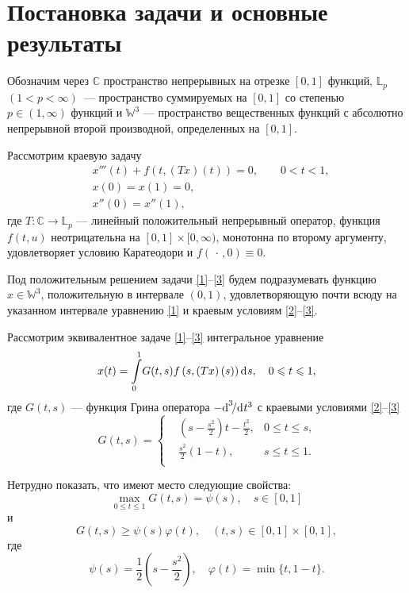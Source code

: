 \documentclass[press]{vestnik}
\begin{document}
\section{Постановка задачи и основные результаты}

Обозначим через $\mathbb{C}$ пространство непрерывных на отрезке $[0, 1]$ функций,  $\mathbb{L}_p$  $(1<p<\infty)$~--- пространство суммируемых на $[0, 1]$ со степенью $p\in (1,\infty)$ функций и  $\mathbb{W}^3$ --- пространство вещественных функций с абсолютно непрерывной второй производной, определенных на $[0, 1]$.

Рассмотрим краевую задачу
\begin{align}
&x'''(t)+f \left (t,\left(Tx \right)(t) \right)=0,\qquad 0<t<1,\label{1}\\
&x(0)=x(1)=0, \label{2} \\
&x''(0)=x''(1), \label{3}
\end{align}
где $T\colon \mathbb{C} \to \mathbb{L}_p$ --- линейный положительный непрерывный оператор, функция $f(t,u)$ неотрицательна на $[0, 1]\times[0, \infty)$, монотонна по второму аргументу, удовлетворяет условию Каратеодори и $f(\,\cdot\,, 0)\equiv0$.

Под положительным решением задачи \eqref{1}--\eqref{3} будем подразумевать  функцию $x\in \mathbb{W}^3$, положительную в интервале $(0, 1)$, удовлетворяющую почти всюду на указанном интервале уравнению \eqref{1} и краевым условиям \eqref{2}--\eqref{3}.

Рассмотрим эквивалентное задаче \eqref{1}--\eqref{3} интегральное уравнение
\begin{align}
x(t)={\int\limits_{0}^{1}} G(t,s)f \left (s,\left(Tx \right)(s) \right)\d s,\quad 0\leqslant t\leqslant 1, \label{4}
\end{align}
где $G(t,s)$ --- функция Грина оператора $-{\d^3}/{\d t^3}$ с краевыми условиями \eqref{2}--\eqref{3}
\[
G(t,s)=\left\{
\begin{aligned}
&\left(s-\frac{s^2}{2}\right)t-\frac{t^2}{2}, & \text{$0\leqslant t\leqslant s$,} \\[2mm]
&\frac{s^2}{2}(1-t), & \text{$s\leqslant t\leqslant 1$}.\\
\end{aligned}\right.
\]

Нетрудно показать, что имеют место следующие свойства:
\begin{equation}
\max_{0\leqslant t\leqslant1}G(t,s)=\psi(s), \quad s\in[0, 1] \label{5}
\end{equation}
и
\begin{equation}
G(t,s)\geqslant \psi(s)\varphi(t), \quad (t,s)\in [0, 1]\times[0, 1], \label{6}
\end{equation}
где 
\[
\psi(s)=\frac12\left(s-\frac{s^2}{2}\right), \quad \varphi(t)=\min\{t, 1-t\}.
\]
\end{document}
